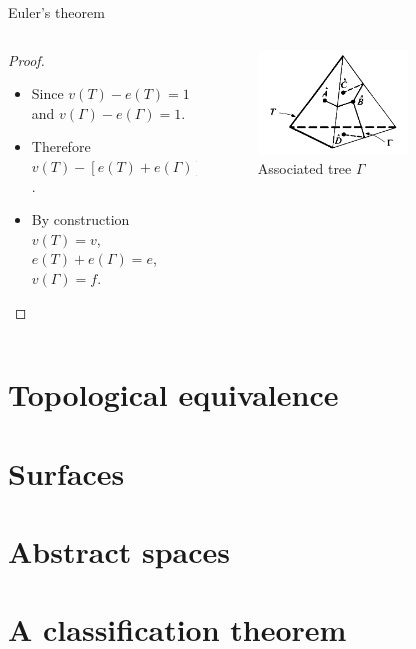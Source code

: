\documentclass{beamer}
\begin{document}
\begin{frame}{Euler's theorem}
\begin{columns}
\begin{column}{0.6\textwidth}
  \begin{proof}
    \begin{itemize}
    \item Since $v(T) - e(T) = 1$ and $v(\Gamma) - e(\Gamma) = 1$.
    \item Therefore $v(T) - [e(T) + e(\Gamma)] + v(\Gamma) = 2$.
    \item By construction $v(T) = v$, $e(T) + e(\Gamma) = e$, $v(\Gamma) = f$.
    \end{itemize}
  \end{proof}
\end{column}
\begin{column}{0.4\textwidth}
    \begin{figure}
    \centering
        \includegraphics[width=0.7\textwidth]{figure_1_5_c.png}
        \caption{Associated tree $\Gamma$}
    \end{figure}
\end{column}
\end{columns}
\end{frame}

\section{Topological equivalence}
\section{Surfaces}
\section{Abstract spaces}
\section{A classification theorem}
\end{document}
